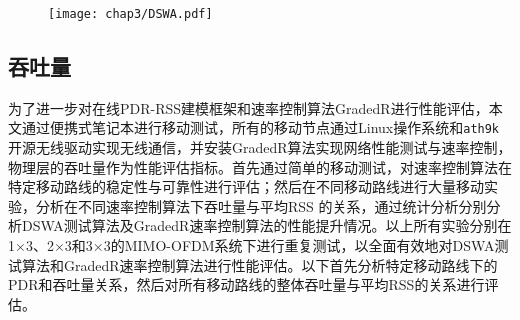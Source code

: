 \begin{figure}[!htp]
\centering
    \texttt{[image: chap3/DSWA.pdf]}
\end{figure}

\subsection{吞吐量}
\label{sec:throughput}

为了进一步对在线PDR-RSS建模框架和速率控制算法GradedR进行性能评估，本文通过便携式笔记本进行移动测试，所有的移动节点通过Linux操作系统和\texttt{ath9k} 开源无线驱动实现无线通信，并安装GradedR算法实现网络性能测试与速率控制，物理层的吞吐量作为性能评估指标。首先通过简单的移动测试，对速率控制算法在特定移动路线的稳定性与可靠性进行评估；然后在不同移动路线进行大量移动实验，分析在不同速率控制算法下吞吐量与平均RSS 的关系，通过统计分析分别分析DSWA测试算法及GradedR速率控制算法的性能提升情况。以上所有实验分别在1$\times$3、2$\times$3和3$\times$3的MIMO-OFDM系统下进行重复测试，以全面有效地对DSWA测试算法和GradedR速率控制算法进行性能评估。以下首先分析特定移动路线下的PDR和吞吐量关系，然后对所有移动路线的整体吞吐量与平均RSS的关系进行评估。


